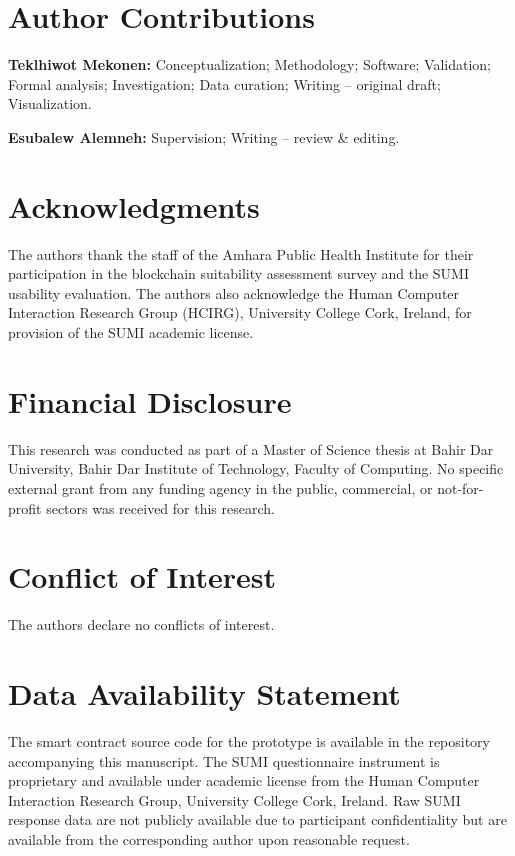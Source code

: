 
\section*{Author Contributions}
\textbf{Teklhiwot Mekonen:} Conceptualization; Methodology; Software; Validation; Formal analysis; Investigation; Data curation; Writing -- original draft; Visualization.

\textbf{Esubalew Alemneh:} Supervision; Writing -- review \& editing.

\section*{Acknowledgments}
The authors thank the staff of the Amhara Public Health Institute for their participation in the blockchain suitability assessment survey and the SUMI usability evaluation. The authors also acknowledge the Human Computer Interaction Research Group (HCIRG), University College Cork, Ireland, for provision of the SUMI academic license.

\section*{Financial Disclosure}
This research was conducted as part of a Master of Science thesis at Bahir Dar University, Bahir Dar Institute of Technology, Faculty of Computing. No specific external grant from any funding agency in the public, commercial, or not-for-profit sectors was received for this research.

\section*{Conflict of Interest}
The authors declare no conflicts of interest.

\section*{Data Availability Statement}
The smart contract source code for the prototype is available in the repository accompanying this manuscript. The SUMI questionnaire instrument is proprietary and available under academic license from the Human Computer Interaction Research Group, University College Cork, Ireland. Raw SUMI response data are not publicly available due to participant confidentiality but are available from the corresponding author upon reasonable request.

